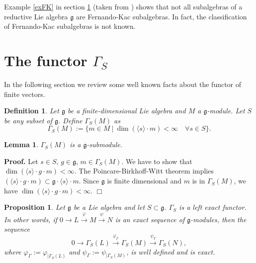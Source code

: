 \documentclass[12pt]{report}
\newtheorem{lemma}[theo]{Lemma}
\newtheorem{prop}[theo]{Proposition}
\newenvironment{proof}[1][]{ \textbf{Proof#1. }}{$\Box$\medskip}
\newtheorem{defi}[theo]{Definition}
\newcommand {\eqdef}{:=}%
\newcommand{\gG}{\mathfrak{g}}
\renewcommand {\phi} {\varphi}
\begin{document}
Example \ref{exFK} in section \ref{secGammaS} (taken from \cite{PS:GenHarishChandra}) shows that not all subalgebras of a reductive Lie algebra $\gG$ are Fernando-Kac subalgebras. In fact, the classification of Fernando-Kac subalgebras is not known.

\section{The functor $\Gamma_S$}\label{secGammaS}
In the following section we review some well known facts about the functor of finite vectors.
\begin{defi} Let $\gG$ be a finite-dimensional Lie algebra and $M$ a $\gG$-module. Let $S$ be any subset of $\gG$. Define $\Gamma_S(M)$ as
\begin{equation}\label{eqZuck}
\Gamma_S(M)\eqdef\{m\in M ~|~\dim (\langle s\rangle\cdot m)<\infty\quad \forall s\in S\}.
\end{equation}
\end{defi}
\begin{lemma}\label{propGamma}
$\Gamma_S(M)$ is a $\gG$-submodule.
\end{lemma}
\begin{proof}
Let $s\in S$, $g\in\gG$, $m\in \Gamma_S(M)$. We have to show that $\dim(\langle s\rangle\cdot g\cdot m) < \infty$. The Poincare-Birkhoff-Witt theorem implies $(\langle s\rangle\cdot g\cdot m)\subset \gG\cdot\langle s\rangle \cdot m$. Since $\gG$ is finite dimensional and $m$ is in $\Gamma_S(M)$, we have $\dim(\langle s\rangle\cdot g\cdot m) < \infty$.
\end{proof}
\begin{prop}\label{propExactZuckerman}
Let $\gG$ be a Lie algebra and let $S\subset\gG$.  $\Gamma_S$ is a left exact functor. In other words, if $0\to L\overset{\phi}{\to} M\overset{\psi}{\to} N$ is an exact sequence of $\gG$-modules, then the sequence
\begin{equation}\label{eqExactZuck}
0\to\Gamma_S(L)\overset{\phi_\Gamma}{\to}\Gamma_S(M)\overset{\psi_\Gamma}{\to}\Gamma_S(N),
\end{equation}
where $\phi_\Gamma:=\phi_{|\Gamma_S(L)}$ and $\psi_\Gamma:=\psi_{|\Gamma_S(M)}$, is well defined and is exact.
\end{prop}
\end{document}
